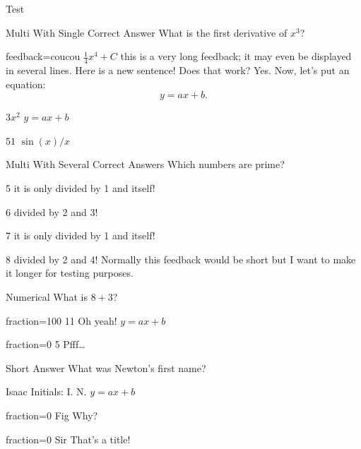 \documentclass{article}
\def\myequation{y=ax+b}
\begin{document}
\begin{quiz}[ %
	] {Test}

\begin{multi}[points=3]{Multi With Single Correct Answer} %
What is the first derivative of $x^3$?
\item[feedback={coucou}] $\frac{1}{4} x^4+C$ \feedback this is a very 
long feedback; it may even be displayed in several lines. Here is a new 
sentence! Does that work? Yes. Now, let's put an equation:
\[\myequation.\]
\item* $3x^2$ \feedback $\myequation$%
\item[] $51$ \feedback $\sin(x)/x$
\end{multi}

\begin{multi}[multiple]{Multi With Several Correct Answers} %
	Which numbers are prime?
	\item* 5 \feedback it is only divided by 1 and itself!
	\item 6 \feedback divided by 2 and 3!
	\item* 7 \feedback it is only divided by 1 and itself!
	\item 8 \feedback divided by 2 and 4! Normally this feedback would be short 
	but I want to make it longer for testing purposes.
\end{multi}


\begin{numerical}[ %
	] {Numerical}
What is $8+3$?
\item[fraction=100] 11 \feedback Oh yeah! $\myequation$
\item[fraction=0] 5 \feedback Pfff\dots
\end{numerical}

\begin{shortanswer}[case sensitive=true]{Short Answer}
What was Newton's first name?
\item Isaac \feedback Initials: I. N. $\myequation$
\item[fraction=0] Fig \feedback Why?
\item{fraction=0} Sir \feedback That's a title!
\end{shortanswer}


\end{quiz}
\end{document}
